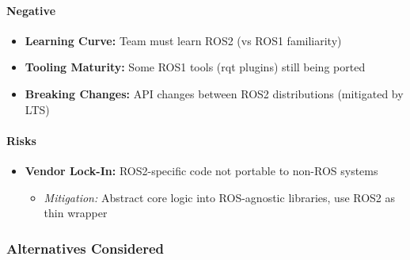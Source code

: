 \documentclass[
]{article}
\providecommand{\tightlist}{%
  \setlength{\itemsep}{0pt}\setlength{\parskip}{0pt}}
\begin{document}
\hypertarget{negative}{%
\paragraph{Negative}\label{negative}}

\begin{itemize}
\tightlist
\item
  \textbf{Learning Curve:} Team must learn ROS2 (vs ROS1 familiarity)
\item
  \textbf{Tooling Maturity:} Some ROS1 tools (rqt plugins) still being
  ported
\item
  \textbf{Breaking Changes:} API changes between ROS2 distributions
  (mitigated by LTS)
\end{itemize}

\hypertarget{risks}{%
\paragraph{Risks}\label{risks}}

\begin{itemize}
\tightlist
\item
  \textbf{Vendor Lock-In:} ROS2-specific code not portable to non-ROS
  systems

  \begin{itemize}
  \tightlist
  \item
    \emph{Mitigation:} Abstract core logic into ROS-agnostic libraries,
    use ROS2 as thin wrapper
  \end{itemize}
\end{itemize}

\hypertarget{alternatives-considered}{%
\subsubsection{Alternatives Considered}\label{alternatives-considered}}
\end{document}
